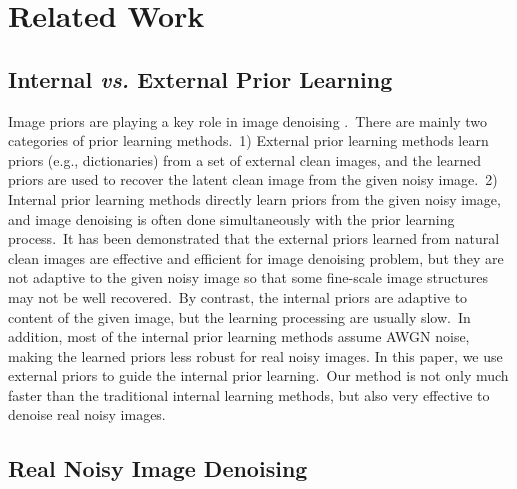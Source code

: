 \documentclass[10pt,twocolumn,letterpaper]{article}
\begin{document}
\vspace{-1mm}
\section{Related Work}

\subsection{Internal \textbf{\emph{vs.}} External Prior Learning}

Image priors are playing a key role in image denoising \cite{ksvd,ncsr,pgpd,foe,epll,ple,iraniinternal}.\ There are mainly two categories of prior learning methods.\ 1) External prior learning methods \cite{pgpd,foe,epll} learn priors (e.g., dictionaries) from a set of external clean images, and the learned priors are used to recover the latent clean image from the given noisy image.\ 2) Internal prior learning methods \cite{ksvd,ncsr,ple,iraniinternal} directly learn priors from the given noisy image, and image denoising is often done simultaneously with the prior learning process.\ It has been demonstrated \cite{pgpd,foe,epll} that the external priors learned from natural clean images are effective and efficient for image denoising problem, but they are not adaptive to the given noisy image so that some fine-scale image structures may not be well recovered.\ By contrast, the internal priors are adaptive to content of the given image, but the learning processing are usually slow.\ In addition, most of the internal prior learning methods \cite{ksvd,ncsr,ple,iraniinternal} assume AWGN noise, making the learned priors less robust for real noisy images. In this paper, we use external priors to guide the internal prior learning.\ Our method is not only much faster than the traditional internal learning methods, but also very effective to denoise real noisy images.

\subsection{Real Noisy Image Denoising}
\end{document}
